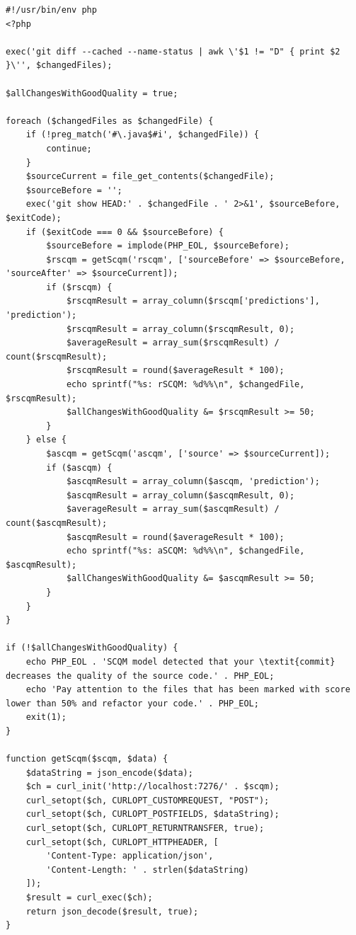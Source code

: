 \documentclass[twoside]{praca}
\begin{document}
\begin{lstlisting}[frame=single,caption={Przykładowy \textit{hook} \texttt{pre-commit} dla systemu kontroli wersji Git integrujący repozytorium z~modelem SCQM},captionpos=b,label={lst:pre-commit-hook}]
#!/usr/bin/env php
<?php

exec('git diff --cached --name-status | awk \'$1 != "D" { print $2 }\'', $changedFiles);

$allChangesWithGoodQuality = true;

foreach ($changedFiles as $changedFile) {
    if (!preg_match('#\.java$#i', $changedFile)) {
        continue;
    }
    $sourceCurrent = file_get_contents($changedFile);
    $sourceBefore = '';
    exec('git show HEAD:' . $changedFile . ' 2>&1', $sourceBefore, $exitCode);
    if ($exitCode === 0 && $sourceBefore) {
        $sourceBefore = implode(PHP_EOL, $sourceBefore);
        $rscqm = getScqm('rscqm', ['sourceBefore' => $sourceBefore, 'sourceAfter' => $sourceCurrent]);
        if ($rscqm) {
            $rscqmResult = array_column($rscqm['predictions'], 'prediction');
            $rscqmResult = array_column($rscqmResult, 0);
            $averageResult = array_sum($rscqmResult) / count($rscqmResult);
            $rscqmResult = round($averageResult * 100);
            echo sprintf("%s: rSCQM: %d%%\n", $changedFile, $rscqmResult);
            $allChangesWithGoodQuality &= $rscqmResult >= 50;
        }
    } else {
        $ascqm = getScqm('ascqm', ['source' => $sourceCurrent]);
        if ($ascqm) {
            $ascqmResult = array_column($ascqm, 'prediction');
            $ascqmResult = array_column($ascqmResult, 0);
            $averageResult = array_sum($ascqmResult) / count($ascqmResult);
            $ascqmResult = round($averageResult * 100);
            echo sprintf("%s: aSCQM: %d%%\n", $changedFile, $ascqmResult);
            $allChangesWithGoodQuality &= $ascqmResult >= 50;
        }
    }
}

if (!$allChangesWithGoodQuality) {
    echo PHP_EOL . 'SCQM model detected that your \textit{commit} decreases the quality of the source code.' . PHP_EOL;
    echo 'Pay attention to the files that has been marked with score lower than 50% and refactor your code.' . PHP_EOL;
    exit(1);
}

function getScqm($scqm, $data) {
    $dataString = json_encode($data);
    $ch = curl_init('http://localhost:7276/' . $scqm);
    curl_setopt($ch, CURLOPT_CUSTOMREQUEST, "POST");
    curl_setopt($ch, CURLOPT_POSTFIELDS, $dataString);
    curl_setopt($ch, CURLOPT_RETURNTRANSFER, true);
    curl_setopt($ch, CURLOPT_HTTPHEADER, [
        'Content-Type: application/json',
        'Content-Length: ' . strlen($dataString)
    ]);
    $result = curl_exec($ch);
    return json_decode($result, true);
}
\end{lstlisting}
\end{document}
